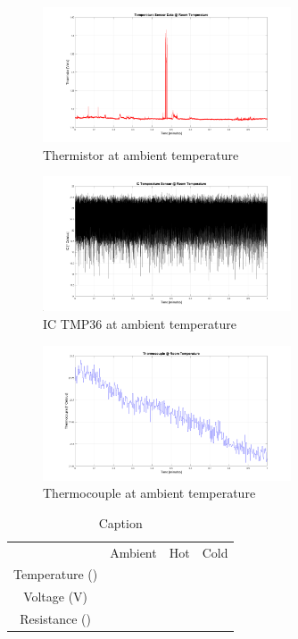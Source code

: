 \documentclass{article}
\begin{document}
    \begin{figure}[H]
        \centering
        \includegraphics[width=0.655\textwidth]{lab2images/thermistor_volt_roomtemp_1min_plot.png}
        \caption{Thermistor at ambient temperature}
    \end{figure}
    
    \begin{figure}[H]
        \centering
        \includegraphics[width=0.655\textwidth]{lab2images/ICTMP36_roomtemp_1min_plot.png}
        \caption{IC TMP36 at ambient temperature}
    \end{figure}
    
    \begin{figure}[H]
        \centering
        \includegraphics[width=0.655\textwidth]{lab2images/thermocouple_roomtemp_1min_plot.png}
        \caption{Thermocouple at ambient temperature}
    \end{figure}

    \begin{table}
    \centering
    \begin{tabular}{cccc}
         &  Ambient&  Hot& Cold\\
         Temperature ()&  &  & \\
         Voltage (V)&  &  & \\
 Resistance ()& & &\\
    \end{tabular}
    \caption{Caption}
    \label{tab:my_label}
\end{table}
    
\end{document}
